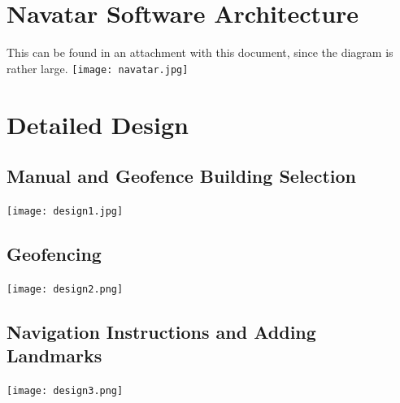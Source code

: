 \documentclass{scrreprt}
\begin{document}
	\section{Navatar Software Architecture}
		This can be found in an attachment with this document, since the diagram is rather large.
		\texttt{[image: navatar.jpg]}
	\pagebreak
	\section{Detailed Design}
		\subsection{Manual and Geofence Building Selection}
			\texttt{[image: design1.jpg]}
		\pagebreak	
		\subsection{Geofencing}
			\texttt{[image: design2.png]}
		\subsection{Navigation Instructions and Adding Landmarks}
			\texttt{[image: design3.png]}
\end{document}
